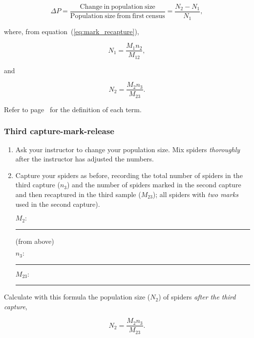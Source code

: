 \documentclass[12pt, hidelinks]{exam}
\begin{document}
\begin{questions}
\begin{equation}
	\Delta P = \dfrac{\mathrm{Change~in~population~size}}{\mathrm{Population~size~from~first~census}} = \dfrac{N_2 - N_1}{N_1},
\end{equation}

where, from equation~(\ref{eq:mark_recapture}), 

\begin{equation*}
N_1 = \dfrac{M_1 n_2}{M_{12}},
\end{equation*}

and

\begin{equation}
N_2 = \dfrac{M_2 n_3}{M_{23}}.
\end{equation}

Refer to page~\pageref{eq:terms} for the definition of each term.  

\subsubsection*{Third capture-mark-release}\label{sec:third-mark}

\begin{enumerate}

	\item Ask your instructor to change your population size. Mix spiders \emph{thoroughly}
after the instructor has adjusted the numbers.

	\item Capture your spiders as before, recording the total number of spiders in
the third capture ($n_3$) and the number of
spiders marked in the second capture and then recaptured in the third
sample ($M_{23}$); all spiders with \emph{two marks} used in the
second capture).  

	\begin{multicols}{2}
		$M_2\colon$ \rule{0.75in}{0.4pt} (from above) \bigskip

		$n_3\colon$ \rule{0.75in}{0.4pt} 
	
		\columnbreak 
		
		$M_{23}\colon$ \rule{0.75in}{0.4pt}\bigskip
	
	\end{multicols}
	
\end{enumerate}

\question
Calculate with this formula the population size ($N_2$) of
spiders \emph{after the third capture},

\[ N_2 = \dfrac{M_2 n_3}{M_{23}}. \]



\end{questions}
\end{document}
